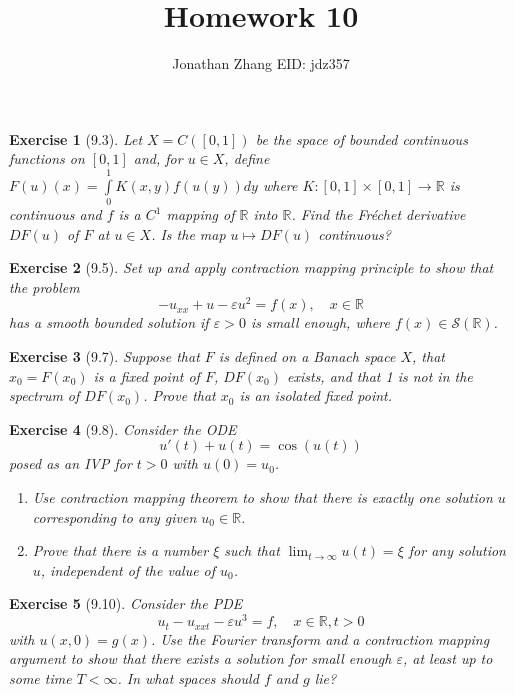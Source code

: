 \documentclass[letterpaper,twoside,11pt]{article}
\theoremstyle{mystyle}
\newtheorem*{exercise}{Exercise}
\newcommand{\R}{{\mathbb R}}
\newcommand{\sch}{\mathcal S}
\begin{document}
\title{\vspace{-2\baselineskip} 
Homework 10
}
\author{Jonathan Zhang \qquad EID: { jdz357} }
\date{}
\maketitle


\begin{exercise}[9.3]
  Let $X = C([0,1])$ be the space of bounded continuous functions on $[0,1]$ and, for $u \in X$, define $F(u)(x) = \int\limits_0^1 K(x, y) f(u(y))dy$ where $K:[0,1] \times [0,1] \to \R$ is continuous and $f$ is a $C^1$ mapping of $\R$ into $\R$. Find the Fr\'echet derivative $DF(u)$ of $F$ at $u\in X$. Is the map $u \mapsto DF(u)$ continuous?
\end{exercise}

\begin{exercise}[9.5]
  Set up and apply contraction mapping principle to show that the problem 
  \[-u_{xx} + u - \varepsilon u^2 = f(x), \quad x\in \R\]
  has a smooth bounded solution if $\varepsilon>0$ is small enough, where $f(x) \in \sch (\R)$. 
\end{exercise}

\begin{exercise}[9.7]
  Suppose that $F$ is defined on a Banach space $X$, that $x_0 = F(x_0)$ is a fixed point of $F$, $DF(x_0)$ exists, and that 1 is not in the spectrum of $DF(x_0)$. Prove that $x_0$ is an isolated fixed point. 
\end{exercise}

\begin{exercise}[9.8]
  Consider the ODE 
  \[u'(t) + u(t) = \cos(u(t))\]
  posed as an IVP for $t > 0$ with $u(0) = u_0$. 
  \begin{enumerate}
    \item Use contraction mapping theorem to show that there is exactly one solution $u$ corresponding to any given $u_0 \in \R$. 
    \item Prove that there is a number $\xi$ such that $\lim_{t\to \infty} u(t) = \xi$ for any solution $u$, independent of the value of $u_0$. 
  \end{enumerate}
\end{exercise}

\begin{exercise}[9.10]
  Consider the PDE 
  \[u_{t} - u_{xxt} - \varepsilon u^3 = f, \quad x\in \R, t>0 \]
  with $u(x,0) = g(x)$. Use the Fourier transform and a contraction mapping argument to show that there exists a solution for small enough $\varepsilon$, at least up to some time $T< \infty$. In what spaces should $f$ and $g$ lie? 
\end{exercise}
\end{document}
